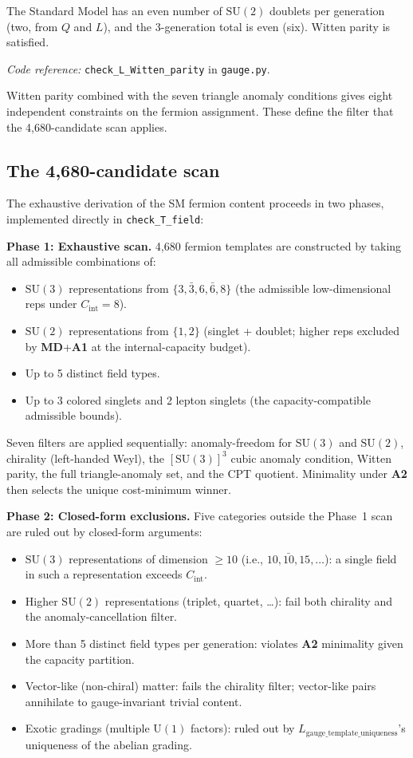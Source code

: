 \documentclass[11pt]{article}
\newcommand{\coderef}[2]{\smallskip\noindent\textit{Code reference:} \texttt{#1} in \texttt{#2}.}
\newcommand{\SU}{\mathrm{SU}}
\newcommand{\Un}{\mathrm{U}}
\newcommand{\Aone}{\textbf{A1}}
\newcommand{\Atwo}{\textbf{A2}}
\newcommand{\MD}{\textbf{MD}}
\theoremstyle{definition}
\begin{document}
The Standard Model has an even number of $\SU(2)$ doublets per generation (two, from $Q$ and $L$), and the 3-generation total is even (six). Witten parity is satisfied.

\coderef{check\_L\_Witten\_parity}{gauge.py}

Witten parity combined with the seven triangle anomaly conditions gives eight independent constraints on the fermion assignment. These define the filter that the 4{,}680-candidate scan applies.

\subsection{The 4{,}680-candidate scan}\label{sec:4680_scan}

The exhaustive derivation of the SM fermion content proceeds in two phases, implemented directly in \texttt{check\_T\_field}:

\textbf{Phase 1: Exhaustive scan.} 4{,}680 fermion templates are constructed by taking all admissible combinations of:
\begin{itemize}
    \item $\SU(3)$ representations from $\{3, \bar 3, 6, \bar 6, 8\}$ (the admissible low-dimensional reps under $C_{\mathrm{int}} = 8$).
    \item $\SU(2)$ representations from $\{1, 2\}$ (singlet + doublet; higher reps excluded by \MD{}+\Aone{} at the internal-capacity budget).
    \item Up to 5 distinct field types.
    \item Up to 3 colored singlets and 2 lepton singlets (the capacity-compatible admissible bounds).
\end{itemize}

Seven filters are applied sequentially: anomaly-freedom for $\SU(3)$ and $\SU(2)$, chirality (left-handed Weyl), the $[\SU(3)]^3$ cubic anomaly condition, Witten parity, the full triangle-anomaly set, and the CPT quotient. Minimality under \Atwo{} then selects the unique cost-minimum winner.

\textbf{Phase 2: Closed-form exclusions.} Five categories outside the Phase~1 scan are ruled out by closed-form arguments:
\begin{itemize}
    \item $\SU(3)$ representations of dimension $\geq 10$ (i.e., $10, \bar{10}, 15, \ldots$): a single field in such a representation exceeds $C_{\mathrm{int}}$.
    \item Higher $\SU(2)$ representations (triplet, quartet, \ldots): fail both chirality and the anomaly-cancellation filter.
    \item More than 5 distinct field types per generation: violates \Atwo{} minimality given the capacity partition.
    \item Vector-like (non-chiral) matter: fails the chirality filter; vector-like pairs annihilate to gauge-invariant trivial content.
    \item Exotic gradings (multiple $\Un(1)$ factors): ruled out by $L_{\mathrm{gauge\_template\_uniqueness}}$'s uniqueness of the abelian grading.
\end{itemize}
\end{document}

